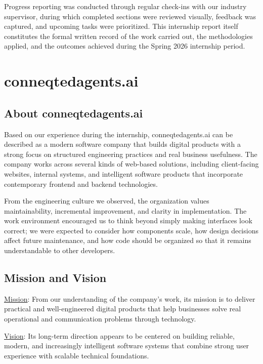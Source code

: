 \documentclass[12pt, oneside, a4paper]{book}
\begin{document}
\begin{doublespace}
Progress reporting was conducted through regular check-ins with our industry supervisor,
during which completed sections were reviewed visually, feedback was captured, and
upcoming tasks were prioritized. This internship report itself constitutes the formal
written record of the work carried out, the methodologies applied, and the outcomes
achieved during the Spring 2026 internship period.

\chapter{conneqtedagents.ai}

\section{About conneqtedagents.ai}

Based on our experience during the internship, conneqtedagents.ai can be described as a
modern software company that builds digital products with a strong focus on structured
engineering practices and real business usefulness. The company works across several kinds
of web-based solutions, including client-facing websites, internal systems, and intelligent
software products that incorporate contemporary frontend and backend technologies.

From the engineering culture we observed, the organization values maintainability,
incremental improvement, and clarity in implementation. The work environment encouraged us
to think beyond simply making interfaces look correct; we were expected to consider how
components scale, how design decisions affect future maintenance, and how code should be
organized so that it remains understandable to other developers.

\section{Mission and Vision}

\noindent\underline{Mission}: From our understanding of the company's work, its mission is
to deliver practical and well-engineered digital products that help businesses solve
real operational and communication problems through technology.

\noindent\underline{Vision}: Its long-term direction appears to be centered on building
reliable, modern, and increasingly intelligent software systems that combine strong user
experience with scalable technical foundations.


\end{doublespace}
\end{document}
